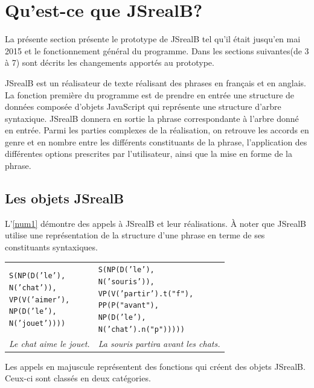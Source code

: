 \documentclass[11pt]{article} %
\newcommand{\system}[1]{\textsf{#1}}
\newcommand{\JSB}{\system{JSrealB}}
\newcommand{\real}[1]{\emph{#1}}
\begin{document}
\section{Qu'est-ce que \JSB{}?}

La présente section présente le prototype de \JSB{} tel qu'il
était jusqu'en mai 2015 et le fonctionnement général du programme. 
Dans les sections suivantes(de 3 à 7) sont décrits
les changements apportés au prototype.

\JSB{} est un réalisateur de texte réalisant des phrases en français
et en anglais. La fonction première du programme est de prendre en
entrée une structure de données composée d'objets JavaScript
qui représente une structure d'arbre syntaxique.
\JSB{} donnera en sortie la phrase correspondante à l'arbre donné
en entrée. Parmi les parties complexes de la réalisation, on retrouve
les accords en genre et en nombre entre les différents constituants
de la phrase, l'application des différentes options prescrites par
l'utilisateur, ainsi que la mise en forme de la phrase. 

\subsection{Les objets \JSB{}}

L'\autoref{num1} démontre des appels à \JSB{} et leur réalisations. À noter que
\JSB{} utilise une représentation de la structure d'une phrase en terme
de ses constituants syntaxiques.\newline
\begin{example}
\caption{Quelques utilisations de \JSB{}}
\begin{tabular}{p{7cm} p{7cm}}
\begin{alltt}
S(NP(D('le'),
     N('chat')),
  VP(V('aimer'),
     NP(D('le'),
        N('jouet'))))
\end{alltt} &
\begin{alltt}
S(NP(D('le'),
     N('souris')),
  VP(V('partir').t("f"),
     PP(P("avant"),
        NP(D('le'),
           N('chat').n("p")))))
\end{alltt} \\
\real{Le chat aime le jouet.} & \real{La souris partira avant les chats.} \\
\end{tabular}
\label{num1}
\end{example}

Les appels en majuscule représentent des fonctions qui créent des objets \JSB{}. Ceux-ci sont
classés en deux catégories. 
\end{document}
